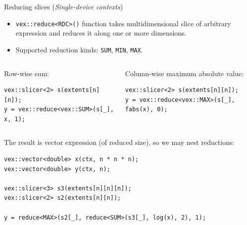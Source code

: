\documentclass[@BEAMER_OPTIONS@]{beamer}
\newcommand{\code}[1]{\lstinline|#1|}
\newcommand{\singledevice}{\hspace{1cm}\footnotesize(\emph{Single-device contexts})}
\begin{document}
\begin{frame}[fragile]{Reducing slices \singledevice}
    \begin{itemize}
        \item \code{vex::reduce<RDC>()} function takes multidimensional slice
            of arbitrary expression and reduces it along one or more
            dimensions.
        \item Supported reduction kinds: \code{SUM}, \code{MIN}, \code{MAX}.
    \end{itemize}
    \begin{columns}
        \begin{column}{0.48\textwidth}
            \begin{exampleblock}{Row-wise sum:}
                \begin{lstlisting}
vex::slicer<2> s(extents[n][n]);
y = vex::reduce<vex::SUM>(s[_], x, 1);
                \end{lstlisting}
            \end{exampleblock}
        \end{column}
        \pause
        \begin{column}{0.48\textwidth}
            \begin{exampleblock}{Column-wise maximum absolute value:}
                \begin{lstlisting}
vex::slicer<2> s(extents[n][n]);
y = vex::reduce<vex::MAX>(s[_], fabs(x), 0);
                \end{lstlisting}
            \end{exampleblock}
        \end{column}
    \end{columns}
    \pause
    \vspace{\baselineskip}
    \begin{exampleblock}{The result is vector expression (of reduced size), so
        we may nest reductions:}
        \begin{lstlisting}
vex::vector<double> x(ctx, n * n * n);
vex::vector<double> y(ctx, n);

vex::slicer<3> s3(extents[n][n][n]);
vex::slicer<2> s2(extents[n][n]);

y = reduce<MAX>(s2[_], reduce<SUM>(s3[_], log(x), 2), 1);
        \end{lstlisting}
    \end{exampleblock}
\end{frame}
\end{document}
